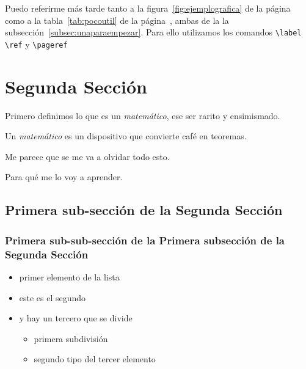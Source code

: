 Puedo referirme m\'as tarde tanto a la figura~\ref{fig:ejemplografica} de la p\'agina~\pageref{fig:ejemplografica}
como a la tabla~\ref{tab:pocoutil} de la p\'agina~\pageref{tab:pocoutil}, ambas
de la la subsecci\'on~\ref{subsec:unaparaempezar}. Para ello utilizamos los
comandos \verb$\label$ \verb$\ref$ y \verb$\pageref$



\section{Segunda Secci\'on}
Primero definimos lo que es un \emph{matem\'atico}, ese ser rarito y ensimismado.
\begin{definition}
  Un \emph{matem\'atico} es un dispositivo que convierte caf\'e en teoremas.
\end{definition}
\begin{conjecture}
Me parece que se me va a olvidar todo esto.
\end{conjecture}
\begin{corollary}
Para qu\'e me lo voy a aprender.
\end{corollary}

\subsection{Primera sub-secci\'on de la Segunda Secci\'on}

\subsubsection{Primera sub-sub-secci\'on de la Primera subsecci\'on de la Segunda Secci\'on}
\begin{itemize}
  \item primer elemento de la lista
  \item este es el segundo
  \item y hay un tercero que se divide
  \begin{itemize}
    \item primera subdivisi\'on
    \item segundo tipo del tercer elemento
  \end{itemize}
\end{itemize}

